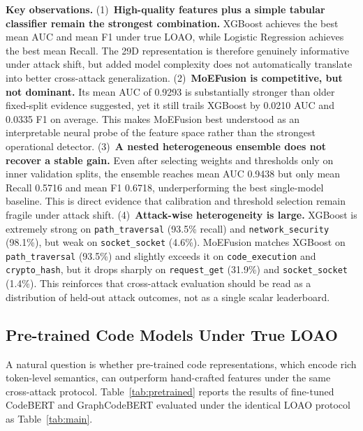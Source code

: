 ﻿\documentclass[sigconf,review,anonymous]{acmart}
\newcommand{\sys}{MoEFusion}
\begin{document}
\noindent

\textbf{Key observations.}
(1)~\textbf{High-quality features plus a simple tabular classifier remain the
strongest combination.} XGBoost achieves the best mean AUC and mean F1 under
true LOAO, while Logistic Regression achieves the best mean Recall.
The 29D representation is therefore genuinely informative under attack shift,
but added model complexity does not automatically translate into better
cross-attack generalization.
(2)~\textbf{\sys{} is competitive, but not dominant.} Its mean AUC of 0.9293 is
substantially stronger than older fixed-split evidence suggested, yet it still
trails XGBoost by 0.0210 AUC and 0.0335 F1 on average.
This makes \sys{} best understood as an interpretable neural probe of the
feature space rather than the strongest operational detector.
(3)~\textbf{A nested heterogeneous ensemble does not recover a stable gain.}
Even after selecting weights and thresholds only on inner validation splits, the
ensemble reaches mean AUC 0.9438 but only mean Recall 0.5716 and mean F1 0.6718,
underperforming the best single-model baseline.
This is direct evidence that calibration and threshold selection remain fragile
under attack shift.
(4)~\textbf{Attack-wise heterogeneity is large.} XGBoost is extremely strong on
\texttt{path\_traversal} (93.5\% recall) and \texttt{network\_security}
(98.1\%), but weak on \texttt{socket\_socket} (4.6\%).
\sys{} matches XGBoost on \texttt{path\_traversal} (93.5\%) and slightly exceeds
it on \texttt{code\_execution} and \texttt{crypto\_hash}, but it drops sharply on
\texttt{request\_get} (31.9\%) and \texttt{socket\_socket} (1.4\%).
This reinforces that cross-attack evaluation should be read as a distribution of
held-out attack outcomes, not as a single scalar leaderboard.

\subsection{Pre-trained Code Models Under True LOAO}
\label{sec:exp:pretrained}

A natural question is whether pre-trained code representations, which encode
rich token-level semantics, can outperform hand-crafted features under the same
cross-attack protocol. Table~\ref{tab:pretrained} reports the results of
fine-tuned CodeBERT and GraphCodeBERT evaluated under the identical LOAO
protocol as Table~\ref{tab:main}.
\end{document}
